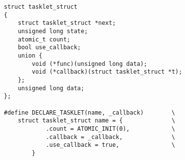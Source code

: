 
\begin{lstlisting}
struct tasklet_struct
{
	struct tasklet_struct *next;
	unsigned long state;
	atomic_t count;
	bool use_callback;
	union {
		void (*func)(unsigned long data);
		void (*callback)(struct tasklet_struct *t);
	};
	unsigned long data;
};

#define DECLARE_TASKLET(name, _callback)		\
    struct tasklet_struct name = {				\
            .count = ATOMIC_INIT(0),			\
            .callback = _callback,				\
            .use_callback = true,				\
        }
\end{lstlisting}
